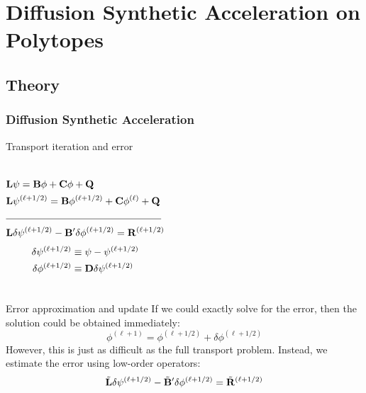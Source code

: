 \documentclass[compress,10pt]{beamer}
\begin{document}
\section[DSA on Polytopes]{Diffusion Synthetic Acceleration on Polytopes}
\subsection{Theory}
\typeout{***********************************************************************************}
\begin{frame}[t]\frametitle{Diffusion Synthetic Acceleration}
\begin{block}{Transport iteration and error}{\small
\begin{columns}
\begin{equation*}
\begin{aligned}
&{\bf L} \psi = {\bf B} \phi + {\bf C} \phi + {\bf Q} \\
&{\bf L} \psi^{(\ell+1/2)} = {\bf B} \phi^{(\ell+1/2)} + {\bf C} \phi^{(\ell)} + {\bf Q} \\
&\noindent\rule{5.5cm}{0.4pt} \\
&{\bf L} \delta \psi^{(\ell+1/2)} - {\bf B}' \delta \phi^{(\ell+1/2)} = {\bf R}^{(\ell+1/2)}
\end{aligned}
\end{equation*}
\begin{equation*}
\begin{aligned}
\delta \psi^{(\ell+1/2)} &\equiv \psi - \psi^{(\ell+1/2)} \\
\delta \phi^{(\ell+1/2)} &\equiv {\bf D} \delta \psi^{(\ell+1/2)}
\end{aligned}
\end{equation*}
\end{columns}}
\end{block}
\begin{block}{Error approximation and update}{\small
If we could exactly solve for the error, then the solution could be obtained immediately:
\begin{equation*}
\phi^{(\ell+1)} = \phi^{(\ell+1/2)} + \delta \phi^{(\ell+1/2)}
\end{equation*}
However, this is just as difficult as the full transport problem. Instead, we estimate the error using low-order operators:
\begin{equation*}
\tilde{{\bf L}} \delta \psi^{(\ell+1/2)} - \tilde{{\bf B}}' \delta \phi^{(\ell+1/2)} = \tilde{{\bf R}}^{(\ell+1/2)}
\end{equation*}
}\end{block}
\end{frame}
\end{document}
